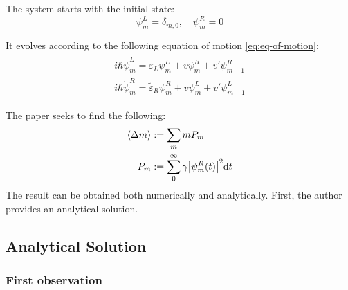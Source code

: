 \documentclass{article}
\begin{document}
The system starts with the initial state:
\begin{equation}
    \psi^L_m = \delta_{m,0},\quad \psi^R_m = 0
\end{equation}

It evolves according to the following equation of motion
\ref{eq:eq-of-motion}:
\begin{align*}
    \begin{aligned}
    i\hbar \dot{\psi}^L_m = \varepsilon_L\psi^L_m + v\psi^R_m
    +v'\psi^R_{m+1} \\
    i\hbar \dot{\psi}^R_m = \tilde{\varepsilon}_R\psi^R_m + v\psi^L_m
    +v'\psi^L_{m-1}
    \end{aligned}
\end{align*}

The paper seeks to find the following:
\begin{align}
    \braket{\Delta m} &:= \sum_m m P_m \\
    P_m &:= \sum_0^\infty \gamma\abs{\psi^R_m(t)}^2 \dd t
    \label{eq:pm-def}
\end{align}
The result can be obtained both numerically and analytically. First,
the author provides an analytical solution.

\subsection{Analytical Solution}
\label{sec:Analytical-Solution}

\subsubsection{First observation}
\label{sec:First-observation}
\end{document}
